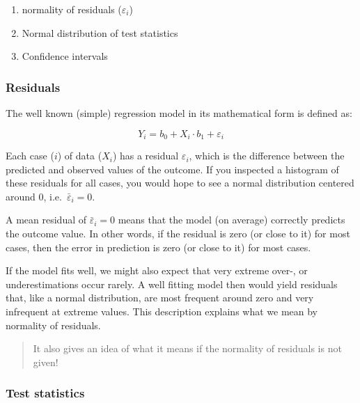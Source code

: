 \documentclass[
]{article}
\providecommand{\tightlist}{%
  \setlength{\itemsep}{0pt}\setlength{\parskip}{0pt}}
\begin{document}
\begin{enumerate}
\def\labelenumi{\arabic{enumi}.}
\tightlist
\item
  normality of residuals (\(\varepsilon_i\))
\item
  Normal distribution of test statistics
\item
  Confidence intervals
\end{enumerate}

\subsubsection*{Residuals}\label{residuals}

The well known (simple) regression model in its mathematical form is defined as:

\begin{equation}
  Y_i = b_0 + X_i \cdot b_1 + \varepsilon_i
\end{equation}

Each case (\(i\)) of data (\(X_i\)) has a residual \(\varepsilon_i\), which is the difference between the predicted and observed values of the outcome. If you inspected a histogram of these residuals for all cases, you would hope to see a normal distribution centered around 0, i.e.~\(\bar{\varepsilon}_i = 0\).

A mean residual of \(\bar{\varepsilon}_i = 0\) means that the model (on average) correctly predicts the outcome value. In other words, if the residual is zero (or close to it) for most cases, then the error in prediction is zero (or close to it) for most cases.

If the model fits well, we might also expect that very extreme over-, or underestimations occur rarely. A well fitting model then would yield residuals that, like a normal distribution, are most frequent around zero and very infrequent at extreme values. This description explains what we mean by normality of residuals.

\begin{quote}
It also gives an idea of what it means if the normality of residuals is not given!
\end{quote}

\subsubsection*{Test statistics}\label{test-statistics}
\end{document}
